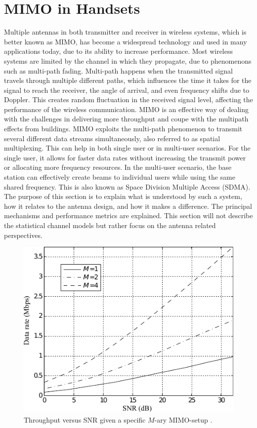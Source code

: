 \section{MIMO in Handsets}
\label{sec:mimo_in_handsets}
\begin{aautop}
Multiple antennas in both transmitter and receiver in wireless systems, which is better known as MIMO, has become a widespread technology and used in many applications today, due to its ability to increase performance. Most wireless systems are limited by the channel in which they propagate, due to phenomenons such as multi-path fading. Multi-path happens when the transmitted signal travels through multiple different paths, which influences the time it takes for the signal to reach the receiver, the angle of arrival, and even frequency shifts due to Doppler. This creates random fluctuation in the received signal level, affecting the performance of the wireless communication. MIMO is an effective way of dealing with the challenges in delivering more throughput and coupe with the multipath effects from buildings. MIMO exploits the multi-path phenomenon to transmit several different data streams simultaneously, also referred to as spatial multiplexing. This can help in both single user or in multi-user scenarios. For the single user, it allows for faster data rates without increasing the transmit power or allocating more frequency resources. In the multi-user scenario, the base station can effectively create beams to individual users while using the same shared frequency. This is also known as Space Division Multiple Access (SDMA). The purpose of this section is to explain what is understood by such a system, how it relates to the antenna design, and how it makes a difference. The principal mechanisms and performance metrics are explained. This section will not describe the statistical channel models but rather focus on the antenna related perspectives.
\end{aautop}

\begin{figure}[htbp]
  \centering
  \includegraphics[scale=1.2]{img/analysis/datarateMimo}
  \caption{Throughput versus SNR given a specific $M$-ary MIMO-setup \cite{Ezio2007MIMO}.}
  \label{fig:mimo-throughput}
\end{figure}

